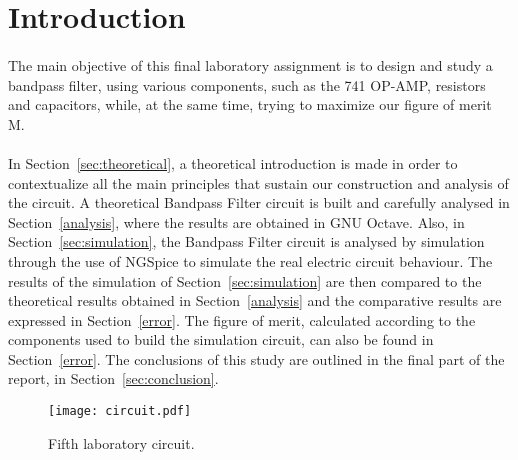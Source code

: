 \pagebreak

\section{Introduction}
\label{sec:introduction}

\paragraph{}The main objective of this final laboratory assignment is to design and study a bandpass filter, using various components, such as the 741 OP-AMP, resistors and capacitors, while, at the same time, trying to maximize our figure of merit M.

\paragraph{}
In Section~\ref{sec:theoretical}, a theoretical introduction is made in order to contextualize all the main principles that sustain our construction and analysis of the circuit. A theoretical Bandpass Filter circuit is built and carefully analysed in Section~\ref{analysis}, where the results are obtained in GNU Octave. Also, in Section~\ref{sec:simulation}, the Bandpass Filter circuit is analysed by simulation through the use of NGSpice to simulate the real electric circuit behaviour. The results of the simulation of Section~\ref{sec:simulation} are then compared to the theoretical results obtained in Section~\ref{analysis} and the comparative results are expressed in Section~\ref{error}. The figure of merit, calculated according to the components used to build the simulation circuit, can also be found in Section~\ref{error}. The conclusions of this study are outlined in the final part of the report, in Section~\ref{sec:conclusion}.

\begin{figure}[H] \centering
	\texttt{[image: circuit.pdf]}
	\caption{Fifth laboratory circuit.}
	\label{fig:circuit}
\end{figure}

